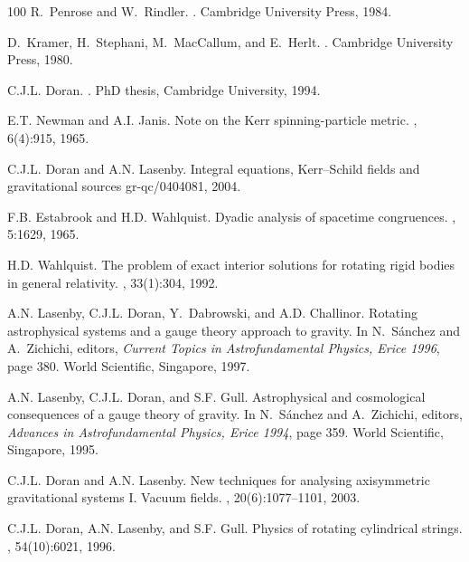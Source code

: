 \documentclass[a4paper]{article}
\numberwithin{equation}{section}
\begin{document}
\begin{thebibliography}{100}
R.~Penrose and W.~Rindler.
.
\newblock Cambridge University Press, 1984.

D.~Kramer, H.~Stephani, M.~Mac{C}allum, and E.~Herlt.
.
\newblock Cambridge University Press, 1980.

C.J.L. Doran.
.
\newblock PhD thesis, Cambridge University, 1994.

E.T. Newman and A.I. Janis.
\newblock Note on the {K}err spinning-particle metric.
, 6(4):915, 1965.

C.J.L. Doran and A.N. Lasenby.
\newblock Integral equations, {K}err--{S}child fields and
gravitational sources
\newblock gr-qc/0404081, 2004.

F.B. Estabrook and H.D. Wahlquist.
\newblock Dyadic analysis of spacetime congruences.
, 5:1629, 1965.

H.D. Wahlquist.
\newblock The problem of exact interior solutions for rotating rigid bodies in
  general relativity.
, 33(1):304, 1992.

A.N. Lasenby, C.J.L. Doran, Y.~Dabrowski, and A.D. Challinor.
\newblock Rotating astrophysical systems and a gauge theory approach to
  gravity.
\newblock In N.~S{\'{a}}nchez and A.~Zichichi, editors, {\em Current Topics in
  Astrofundamental Physics, Erice 1996}, page 380. World Scientific, Singapore,
  1997.

A.N. Lasenby, C.J.L. Doran, and S.F. Gull.
\newblock Astrophysical and cosmological consequences of a gauge theory of
  gravity.
\newblock In N.~S{\'{a}}nchez and A.~Zichichi, editors, {\em Advances in
  Astrofundamental Physics, Erice 1994}, page 359. World Scientific, Singapore,
  1995.

C.J.L. Doran and A.N. Lasenby.
\newblock New techniques for analysing axisymmetric gravitational systems {I}.
  {V}acuum fields.
, 20(6):1077--1101, 2003.

C.J.L. Doran, A.N. Lasenby, and S.F. Gull.
\newblock Physics of rotating cylindrical strings.
, 54(10):6021, 1996.


\end{thebibliography}
\end{document}
